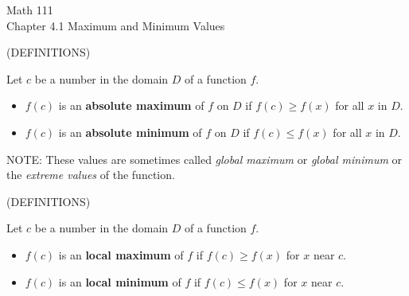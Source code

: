 \documentclass[11pt]{article}
\begin{document}
\begin{center}
\Large
\rm{Math 111}
\\
\rm{Chapter 4.1 Maximum and Minimum Values}
\\
\end{center}
\vspace{0.2in}

(DEFINITIONS)

\vspace{0.1in}
Let $c$ be a number in the domain $D$ of a function $f$.
\begin{itemize}
\item{$f(c)$ is an {\bf absolute maximum} of $f$ on $D$ if $f(c)\ge f(x)$ for all $x$ in $D$.}
\item{$f(c)$ is an {\bf absolute minimum} of $f$ on $D$ if $f(c)\le f(x)$ for all $x$ in $D$.}
  \end{itemize}

\vspace{2.5in}

NOTE:  These values are sometimes called \emph{global maximum} or \emph{global minimum} or  the \emph{extreme values} of the function.

\vspace{0.1in}

(DEFINITIONS)

\vspace{0.1in}
Let $c$ be a number in the domain $D$ of a function $f$.
\begin{itemize}
\item{$f(c)$ is an {\bf local maximum} of $f$ if $f(c)\ge f(x)$ for $x$ near $c$.}
\item{$f(c)$ is an {\bf local minimum} of $f$ if $f(c)\le f(x)$ for $x$ near $c$.}
\end{itemize}
\end{document}
